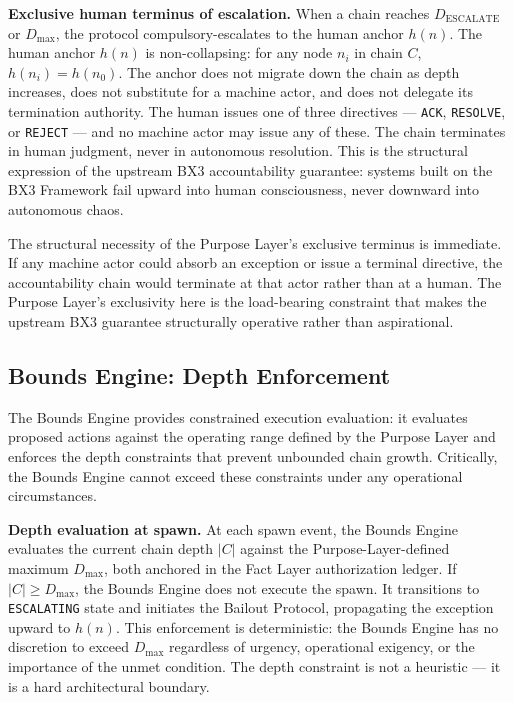 \medskip
\noindent\textbf{Exclusive human terminus of escalation.} When a chain reaches $D_{\mathrm{ESCALATE}}$ or $D_{\mathrm{max}}$, the protocol compulsory-escalates to the human anchor $h(n)$. The human anchor $h(n)$ is non-collapsing: for any node $n_i$ in chain $C$, $h(n_i) = h(n_0)$. The anchor does not migrate down the chain as depth increases, does not substitute for a machine actor, and does not delegate its termination authority. The human issues one of three directives — \texttt{ACK}, \texttt{RESOLVE}, or \texttt{REJECT} — and no machine actor may issue any of these. The chain terminates in human judgment, never in autonomous resolution. This is the structural expression of the upstream BX3 accountability guarantee: systems built on the BX3 Framework fail upward into human consciousness, never downward into autonomous chaos.

The structural necessity of the Purpose Layer's exclusive terminus is immediate. If any machine actor could absorb an exception or issue a terminal directive, the accountability chain would terminate at that actor rather than at a human. The Purpose Layer's exclusivity here is the load-bearing constraint that makes the upstream BX3 guarantee structurally operative rather than aspirational.

\subsection{Bounds Engine: Depth Enforcement}
\label{sec:rs-bounds-depth}

The Bounds Engine provides constrained execution evaluation: it evaluates proposed actions against the operating range defined by the Purpose Layer and enforces the depth constraints that prevent unbounded chain growth. Critically, the Bounds Engine cannot exceed these constraints under any operational circumstances.

\medskip
\noindent\textbf{Depth evaluation at spawn.} At each spawn event, the Bounds Engine evaluates the current chain depth $|C|$ against the Purpose-Layer-defined maximum $D_{\mathrm{max}}$, both anchored in the Fact Layer authorization ledger. If $|C| \geq D_{\mathrm{max}}$, the Bounds Engine does not execute the spawn. It transitions to \texttt{ESCALATING} state and initiates the Bailout Protocol, propagating the exception upward to $h(n)$. This enforcement is deterministic: the Bounds Engine has no discretion to exceed $D_{\mathrm{max}}$ regardless of urgency, operational exigency, or the importance of the unmet condition. The depth constraint is not a heuristic — it is a hard architectural boundary.

